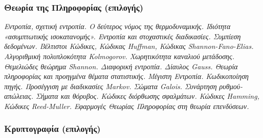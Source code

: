 \hypertarget{ux3b8ux3b5ux3c9ux3c1ux3afux3b1-ux3c4ux3b7ux3c2-ux3c0ux3bbux3b7ux3c1ux3bfux3c6ux3bfux3c1ux3afux3b1ux3c2-ux3b5ux3c0ux3b9ux3bbux3bfux3b3ux3aeux3c2}{%
\subsubsection{Θεωρία της Πληροφορίας
(επιλογής)}\label{ux3b8ux3b5ux3c9ux3c1ux3afux3b1-ux3c4ux3b7ux3c2-ux3c0ux3bbux3b7ux3c1ux3bfux3c6ux3bfux3c1ux3afux3b1ux3c2-ux3b5ux3c0ux3b9ux3bbux3bfux3b3ux3aeux3c2}}

\emph{Εντροπία, σχετική εντροπία. Ο δεύτερος νόμος της θερμοδυναμικής.
Ιδιότητα «ασυμπτωτικής ισοκατανομής». Εντροπία και στοχαστικές
διαδικασίες. Συμπίεση δεδομένων. Βέλτιστοι Κώδικες, Κώδικας Huffman,
Κώδικας Shannon-Fano-Elias. Αλγοριθμική πολυπλοκότητα Kolmogorov.
Χωρητικότητα καναλιού μετάδοσης. Θεμελιώδες θεώρημα Shannon. Διαφορική
εντροπία. Δίαυλος Gauss. Θεωρία πληροφορίας και προηγμένα θέματα
στατιστικής. Μέγιστη Εντροπία. Κωδικοποίηση πηγής. Προσέγγιση με
διαδικασίες Markov. Σώματα Galois. Συνάρτηση ρυθμού-απώλειας. Σήματα και
θόρυβος. Κώδικες διόρθωσης σφαλμάτων. Κώδικες Hamming, Κώδικες
Reed-Muller. Εφαρμογές Θεωρίας Πληροφορίας στη θεωρία επενδύσεων.}

\hypertarget{ux3baux3c1ux3c5ux3c0ux3c4ux3bfux3b3ux3c1ux3b1ux3c6ux3afux3b1-ux3b5ux3c0ux3b9ux3bbux3bfux3b3ux3aeux3c2}{%
\subsubsection{Κρυπτογραφία
(επιλογής)}\label{ux3baux3c1ux3c5ux3c0ux3c4ux3bfux3b3ux3c1ux3b1ux3c6ux3afux3b1-ux3b5ux3c0ux3b9ux3bbux3bfux3b3ux3aeux3c2}}

